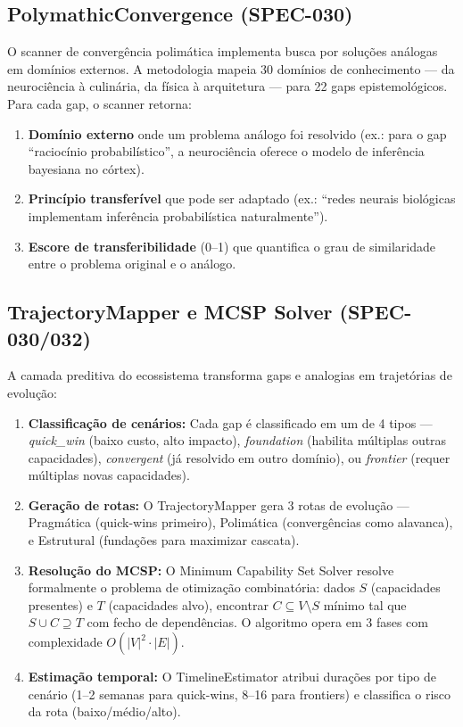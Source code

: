 \subsection{PolymathicConvergence (SPEC-030)}

O scanner de convergência polimática implementa busca por soluções análogas em domínios externos. A metodologia mapeia 30 domínios de conhecimento --- da neurociência à culinária, da física à arquitetura --- para 22 gaps epistemológicos. Para cada gap, o scanner retorna:

\begin{enumerate}
  \item \textbf{Domínio externo} onde um problema análogo foi resolvido (ex.: para o gap ``raciocínio probabilístico'', a neurociência oferece o modelo de inferência bayesiana no córtex).
  \item \textbf{Princípio transferível} que pode ser adaptado (ex.: ``redes neurais biológicas implementam inferência probabilística naturalmente'').
  \item \textbf{Escore de transferibilidade} (0--1) que quantifica o grau de similaridade entre o problema original e o análogo.
\end{enumerate}

\subsection{TrajectoryMapper e MCSP Solver (SPEC-030/032)}

A camada preditiva do ecossistema transforma gaps e analogias em trajetórias de evolução:

\begin{enumerate}
  \item \textbf{Classificação de cenários:} Cada gap é classificado em um de 4 tipos --- \textit{quick\_win} (baixo custo, alto impacto), \textit{foundation} (habilita múltiplas outras capacidades), \textit{convergent} (já resolvido em outro domínio), ou \textit{frontier} (requer múltiplas novas capacidades).
  \item \textbf{Geração de rotas:} O TrajectoryMapper gera 3 rotas de evolução --- Pragmática (quick-wins primeiro), Polimática (convergências como alavanca), e Estrutural (fundações para maximizar cascata).
  \item \textbf{Resolução do MCSP:} O Minimum Capability Set Solver resolve formalmente o problema de otimização combinatória: dados $S$ (capacidades presentes) e $T$ (capacidades alvo), encontrar $C \subseteq V \setminus S$ mínimo tal que $S \cup C \supseteq T$ com fecho de dependências. O algoritmo opera em 3 fases com complexidade $O(|V|^2 \cdot |E|)$.
  \item \textbf{Estimação temporal:} O TimelineEstimator atribui durações por tipo de cenário (1--2 semanas para quick-wins, 8--16 para frontiers) e classifica o risco da rota (baixo/médio/alto).
\end{enumerate}

